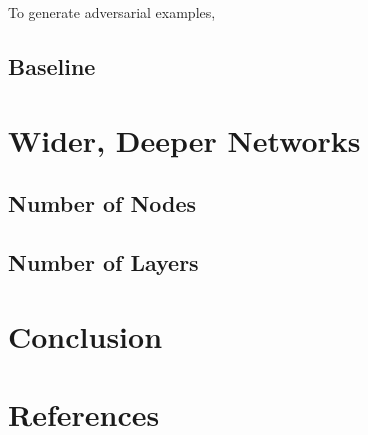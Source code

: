 \documentclass{article}
\begin{document}
To generate adversarial examples, 

\subsection{Baseline}

\section{Wider, Deeper Networks}


\subsection{Number of Nodes}

\subsection{Number of Layers}


\section{Conclusion}




\section{References}



\pagebreak

\printbibliography
\end{document}
